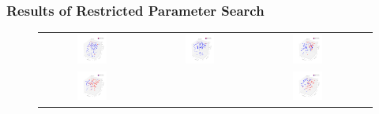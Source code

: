\documentclass{beamer}
\begin{document}
\frame
{
  \frametitle{Results of Restricted Parameter Search}
  \begin{figure}[H]
  \centering
        \begin{tabular}{@{}cc@{}cc@{}}
                \includegraphics[width = 0.3\textwidth]{./pics/Restricted_Parameter_space_d2500_w250.png} &
                \includegraphics[width = 0.3\textwidth]{./pics/Restricted_Parameter_space_d3000_w500.png} &
                \includegraphics[width = 0.3\textwidth]{./pics/Restricted_Parameter_space_d2000_w2000.png} \\
                \includegraphics[width = 0.3\textwidth]{./pics/Restricted_Parameter_space_d500_w3000.png} &&
		\includegraphics[width = 0.3\textwidth]{./pics/Restricted_Parameter_space_d250_w2500.png} \\
        \end{tabular}
        \label{RestrictParam}
  \end{figure}


}
\end{document}
